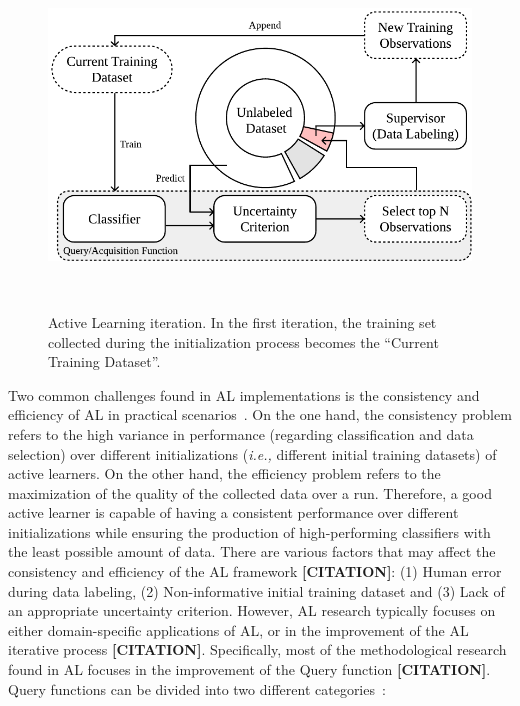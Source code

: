 \documentclass[parskip=full]{scrartcl}
\begin{document}
\begin{figure}[H]
	\centering
	\includegraphics[width=.65\linewidth]{../analysis/al_iteration}
    \caption{%
        Active Learning iteration. In the first iteration, the training set
        collected during the initialization process becomes the ``Current
        Training Dataset''.
    }~\label{fig:al_iteration}
\end{figure}

Two common challenges found in AL implementations is the consistency and
efficiency of AL in practical scenarios~\cite{Kottke2017}. On the one hand,
the consistency problem refers to the high variance in performance (regarding
classification and data selection) over different initializations
(\textit{i.e.,} different initial training datasets) of active learners. On
the other hand, the efficiency problem refers to the maximization of the
quality of the collected data over a run. Therefore, a good active learner is
capable of having a consistent performance over different initializations
while ensuring the production of high-performing classifiers with the least
possible amount of data. There are various factors that may affect the
consistency and efficiency of the AL framework \textbf{[CITATION]}: (1) Human
error during data labeling, (2) Non-informative initial training dataset and
(3) Lack of an appropriate uncertainty criterion. However, AL research
typically focuses on either domain-specific applications of AL, or in the
improvement of the AL iterative process \textbf{[CITATION]}. Specifically,
most of the methodological research found in AL focuses in the improvement of
the Query function \textbf{[CITATION]}. Query functions can be divided into
two different categories~\cite{Gu2021, Kumar2020}: 
\end{document}
